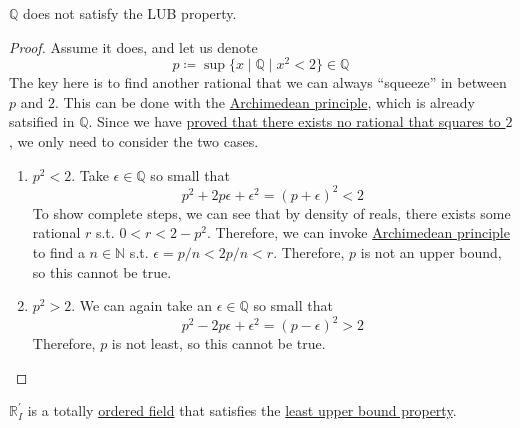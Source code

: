   \begin{theorem}
    \label{thm:rationals-doesnt-satisfy-lub-property}
    $\mathbb{Q}$ does not satisfy the LUB property. 
  \end{theorem}
  \begin{proof}
    Assume it does, and let us denote 
    \begin{equation}
      p \coloneqq \sup \{x \mid \mathbb{Q} \mid x^2 < 2\} \in \mathbb{Q}
    \end{equation}
    The key here is to find another rational that we can always ``squeeze'' in between $p$ and $2$. This can be done with the \hyperref[def:archimedean-principle]{Archimedean principle}, which is already satsified in $\mathbb{Q}$. Since we have \href{thm:sqrt2-irrational}{proved that there exists no rational that squares to $2$}, we only need to consider the two cases. 
    \begin{enumerate}
      \item $p^2 < 2$. Take $\epsilon \in \mathbb{Q}$ so small that 
      \begin{equation}
        p^2 + 2 p \epsilon + \epsilon^2 = (p + \epsilon)^2 < 2
      \end{equation}
      To show complete steps, we can see that by density of reals, there exists some rational $r$ s.t. $0 < r < 2 - p^2$. Therefore, we can invoke \hyperref[def:archimedean-principle]{Archimedean principle} to find a $n \in \mathbb{N}$ s.t. $\epsilon = p/n < 2 p/n < r$. Therefore, $p$ is not an upper bound, so this cannot be true. 

      \item $p^2 > 2$. We can again take an $\epsilon \in \mathbb{Q}$ so small that 
      \begin{equation}
        p^2 - 2 p \epsilon + \epsilon^2 = (p - \epsilon)^2 > 2
      \end{equation}
      Therefore, $p$ is not least, so this cannot be true. 
    \end{enumerate}
  \end{proof}

  \begin{definition}
    \label{def:axiomatic-construction-of-reals-with-lub}
    $\mathbb{R}_I^\prime$ is a totally \hyperref[alg-def:ordered-field]{ordered field} that satisfies the \hyperref[def:least-upper-bound-property]{least upper bound property}.
  \end{definition}


